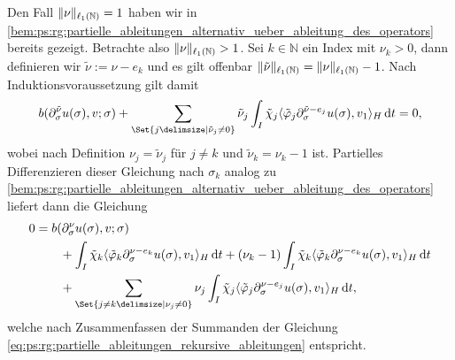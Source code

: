 \begin{Satz}
\begin{Beweis}
        Den Fall $\lVert\nu\rVert_{\ell_{1}(\mathbb{N})} = 1$ haben wir in \cref{bem:ps:rg:partielle_ableitungen_alternativ_ueber_ableitung_des_operators} bereits gezeigt.
        Betrachte also $\lVert\nu\rVert_{\ell_{1}(\mathbb{N})} > 1$.
        Sei $k \in \mathbb{N}$ ein Index mit $\nu_{k} > 0$, dann definieren wir $\tilde{\nu} := \nu - e_{k}$ und es gilt offenbar $\lVert\tilde\nu\rVert_{\ell_{1}(\mathbb{N})} = \lVert\nu\rVert_{\ell_{1}(\mathbb{N})} - 1$.
        Nach Induktionsvoraussetzung gilt damit
        \begin{equation}
            b(\partial^{\tilde{\nu}}_{\sigma} u(\sigma), v; \sigma) + \sum_{\Set{j \given \tilde{\nu}_{j} \neq 0}} \tilde{\nu}_{j} \int_{I} \tilde{\chi}_{j} \skp{\tilde{\varphi}_{j} \partial^{\tilde{\nu} - e_{j}}_{\sigma} u(\sigma)}{v_{1}}{H} \diff t = 0,
        \end{equation}
        wobei nach Definition $\nu_{j} = \tilde{\nu}_{j}$ für $j \neq k$ und $\tilde{\nu}_{k} = \nu_{k} - 1$ ist.
        Partielles Differenzieren dieser Gleichung nach $\sigma_{k}$ analog zu \cref{bem:ps:rg:partielle_ableitungen_alternativ_ueber_ableitung_des_operators} liefert dann die Gleichung
        \begin{align}
            0 &=
                b(\partial^{\nu}_{\sigma} u(\sigma), v; \sigma)
           \\&\qquad          + \int_{I} \tilde{\chi}_{k} \skp{\tilde{\varphi}_{k} \partial^{\nu - e_{k}}_{\sigma} u(\sigma)}{v_{1}}{H} \diff t
                + (\nu_{k} - 1) \int_{I} \tilde{\chi}_{k} \skp{\tilde{\varphi}_{k} \partial^{\nu - e_{k}}_{\sigma} u(\sigma) }{v_{1}}{H} \diff t
           \\&\qquad     + \sum_{\Set{j \neq k \given \nu_{j} \neq 0}} \nu_{j} \int_{I} \tilde{\chi}_{j} \skp{\tilde{\varphi}_{j} \partial^{\nu - e_{j}}_{\sigma} u(\sigma)}{v_{1}}{H} \diff t,
        \end{align}
        welche nach Zusammenfassen der Summanden der Gleichung \cref{eq:ps:rg:partielle_ableitungen_rekursive_ableitungen} entspricht.


\end{Beweis}
\end{Satz}
